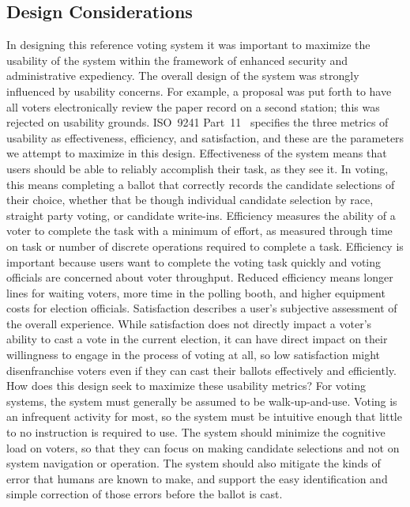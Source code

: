 \subsection{Design Considerations}
In designing this reference voting system it was important to maximize the usability of the system within the framework of enhanced security and administrative expediency. The overall design of the system was strongly influenced by usability concerns. For example, a proposal was put forth to have all voters electronically review the paper record on a second station; this was rejected on usability grounds.
ISO~9241 Part~11~\cite{iso1998} specifies the three metrics of usability as effectiveness, efficiency, and satisfaction, and these are the parameters we attempt to maximize in this design. 
Effectiveness of the system means that users should be able to reliably accomplish their task, as they see it. In voting, this means completing a ballot that correctly records the candidate selections of their choice, whether that be though individual candidate selection by race, straight party voting, or candidate write-ins. 
Efficiency measures the ability of a voter to complete the task with a minimum of effort, as measured through time on task or number of discrete operations required to complete a task. 
Efficiency is important because users want to complete the voting task quickly 
and voting officials are concerned about voter throughput. 
Reduced efficiency means longer lines for waiting voters, more time in the polling booth, and higher 
equipment costs for election officials. 
Satisfaction describes a user's subjective assessment of the overall experience. 
While satisfaction does not directly impact a voter's ability to cast a vote in the current election, it can have direct impact on their willingness to engage in the process of voting at all, so low satisfaction might disenfranchise voters even if they can cast their ballots effectively and efficiently. 
How does this design seek to maximize these usability metrics? 
For voting systems, the system must generally be assumed to be walk-up-and-use. 
Voting is an infrequent activity for most, so the system must be intuitive enough that little to no instruction is required to use. 
The system should minimize the cognitive load on voters, so that they can focus on making candidate selections and not on system navigation or operation. 
The system should also mitigate the kinds of error that humans are known to make, and support the easy identification and simple correction of those errors before the ballot is cast. 
